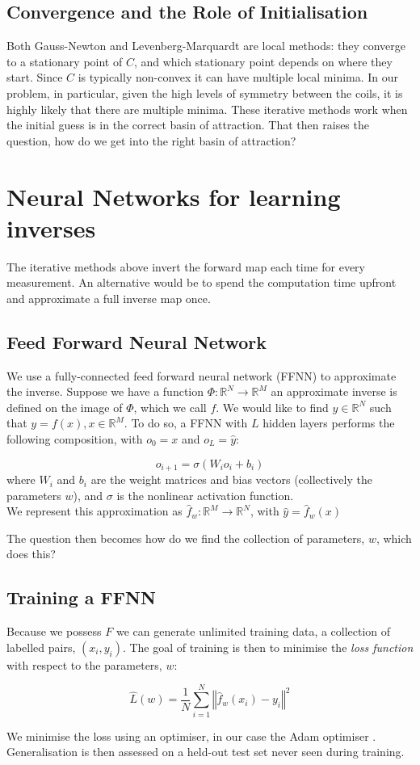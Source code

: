\subsection{Convergence and the Role of Initialisation}
Both Gauss-Newton and Levenberg-Marquardt are local methods: they converge to a stationary point of $C$, and which stationary point depends on where they start. Since $C$ is typically non-convex it can have multiple local minima. In our problem, in particular, given the high levels of symmetry between the coils, it is highly likely that there are multiple minima. These iterative methods work when the initial guess is in the correct basin of attraction. That then raises the question, how do we get into the right basin of attraction?
\section{Neural Networks for learning inverses}
The iterative methods above invert the forward map each time for every measurement. An alternative would be to spend the computation time upfront and approximate a full inverse map once.

\subsection{Feed Forward Neural Network}
We use a fully-connected feed forward neural network (FFNN) to approximate the inverse. Suppose we have a function $\Phi: \mathbb{R}^N \rightarrow \mathbb{R}^M$ an approximate inverse is defined on the image of $\Phi$, which we call $f$. We would like to find $y \in \mathbb{R}^N$ such that $y = f(x), x \in \mathbb{R}^M$. To do so, a FFNN with $L$ hidden layers performs the following composition, with $o_0 = x$ and $o_L = \hat{y}$:

\begin{equation}
  \label{eq:FFNN}
  o_{i+1} = \sigma \left(W_io_i + b_i\right)
\end{equation}
where $W_i$ and $b_i$ are the weight matrices and bias vectors (collectively the parameters $w$), and $\sigma$ is the nonlinear activation function.
\\
We represent this approximation as $\hat{f}_w: \mathbb{R}^M \rightarrow \mathbb{R}^N$, with $\hat{y} = \hat{f}_w(x)$ 

The question then becomes how do we find the collection of parameters, $w$, which does this?

\subsection{Training a FFNN}
Because we possess $F$ we can generate unlimited training data, a collection of labelled pairs, $(x_i,y_i)$. The goal of training is then to minimise the \emph{loss function} with respect to the parameters, $w$:
\begin{definition}
  \label{def:loss}
  $$\hat{L}(w) = \frac{1}{N} \sum_{i = 1}^N \left \Vert \hat{f}_w(x_i) - y_i \right \Vert ^2$$
\end{definition}
We minimise the loss using an optimiser, in our case the Adam optimiser \cite{kingma2017}. Generalisation is then assessed on a held-out test set never seen during training.
